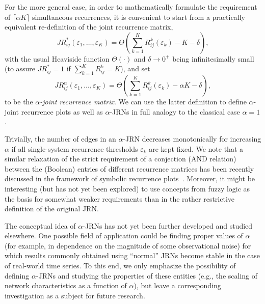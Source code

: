 \documentclass[graybox]{svmult}
\begin{document}
For the more general case, in order to mathematically formulate the requirement of $\lceil\alpha K\rceil$ simultaneous recurrences, it is convenient to start from a practically equivalent re-definition of the joint recurrence matrix,
\begin{equation}
JR^*_{ij}(\varepsilon_1,\dots,\varepsilon_K) = \Theta\left( \sum_{k=1}^K R_{ij}^k(\varepsilon_k) -K-\delta \right),
\end{equation}
\noindent
with the usual Heaviside function $\Theta(\cdot)$ and $\delta\to 0^+$ being infinitesimally small (to assure $JR^*_{ij}=1$ if $\sum_{k=1}^K R_{ij}^k=K$), and set
\begin{equation}
JR^{\alpha}_{ij}(\varepsilon_1,\dots,\varepsilon_K) = \Theta\left( \sum_{k=1}^K R_{ij}^k(\varepsilon_k) -\alpha K-\delta \right),
\end{equation}
\noindent
to be the \emph{$\alpha$-joint recurrence matrix}. We can use the latter definition to define $\alpha$-joint recurrence plots as well as $\alpha$-JRNs in full analogy to the classical case $\alpha=1$.

Trivially, the number of edges in an $\alpha$-JRN decreases monotonically for increasing $\alpha$ if all single-system recurrence thresholds $\varepsilon_k$ are kept fixed. We note that a similar relaxation of the strict requirement of a conjection (AND relation) between the (Boolean) entries of different recurrence matrices has been recently discussed in the framework of symbolic recurrence plots~\cite{Donner2008}. Moreover, it might be interesting (but has not yet been explored) to use concepts from fuzzy logic as the basis for somewhat weaker requirements than in the rather restrictive definition of the original JRN.

The conceptual idea of $\alpha$-JRNs has not yet been further developed and studied elsewhere. One possible field of application could be finding proper values of $\alpha$ (for example, in dependence on the magnitude of some observational noise) for which results commonly obtained using ``normal'' JRNs become stable in the case of real-world time series. To this end, we only emphasize the possibility of defining $\alpha$-JRNs and studying the properties of these entities (e.g., the scaling of network characteristics as a function of $\alpha$), but leave a corresponding investigation as a subject for future research.

\end{document}
